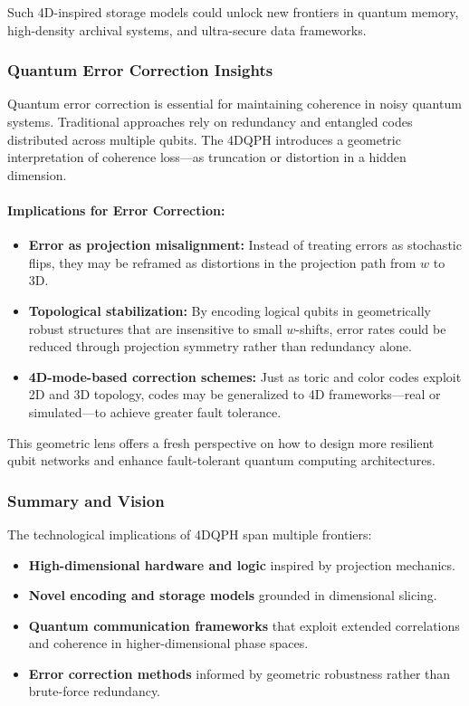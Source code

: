 \documentclass[12pt]{article}
\begin{document}
Such 4D-inspired storage models could unlock new frontiers in quantum memory, high-density archival systems, and ultra-secure data frameworks.

\subsubsection*{Quantum Error Correction Insights}

Quantum error correction is essential for maintaining coherence in noisy quantum systems. Traditional approaches rely on redundancy and entangled codes distributed across multiple qubits. The 4DQPH introduces a geometric interpretation of coherence loss—as truncation or distortion in a hidden dimension.

\paragraph{Implications for Error Correction:}
\begin{itemize}
    \item \textbf{Error as projection misalignment:} Instead of treating errors as stochastic flips, they may be reframed as distortions in the projection path from \( w \) to 3D.
    \item \textbf{Topological stabilization:} By encoding logical qubits in geometrically robust structures that are insensitive to small \( w \)-shifts, error rates could be reduced through projection symmetry rather than redundancy alone.
    \item \textbf{4D-mode-based correction schemes:} Just as toric and color codes exploit 2D and 3D topology, codes may be generalized to 4D frameworks—real or simulated—to achieve greater fault tolerance.
\end{itemize}

This geometric lens offers a fresh perspective on how to design more resilient qubit networks and enhance fault-tolerant quantum computing architectures.

\subsubsection*{Summary and Vision}

The technological implications of 4DQPH span multiple frontiers:
\begin{itemize}
    \item \textbf{High-dimensional hardware and logic} inspired by projection mechanics.
    \item \textbf{Novel encoding and storage models} grounded in dimensional slicing.
    \item \textbf{Quantum communication frameworks} that exploit extended correlations and coherence in higher-dimensional phase spaces.
    \item \textbf{Error correction methods} informed by geometric robustness rather than brute-force redundancy.
\end{itemize}
\end{document}
